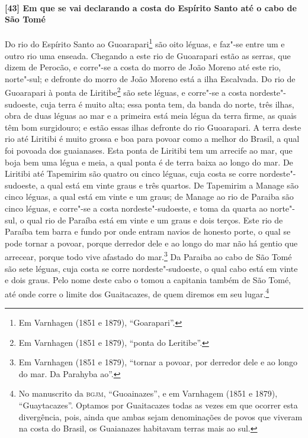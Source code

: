 \begin{linenumbers}
\paragraph{[43] Em que se vai declarando a costa do Espírito Santo até o cabo de São Tomé} \quad
Do rio do Espírito Santo ao Guoarapari\footnote{ Em Varnhagen (1851 e 1879),
``Goarapari''.} são oito léguas, e faz"-se entre um e outro rio uma enseada. Chegando a
este rio de Guoarapari estão as serras, que dizem de Perocão, e corre"-se a costa do morro
de João Moreno até este rio, norte"-sul; e defronte do morro de João Moreno está a ilha
Escalvada. Do rio de Guoarapari à ponta de Liritibe\footnote{ Em Varnhagen (1851 e 1879),
``ponta do Leritibe''.} são sete léguas, e corre"-se a costa nordeste"-sudoeste, cuja terra
é muito alta; essa ponta tem, da banda do norte, três ilhas, obra de duas léguas ao mar e
a primeira está meia légua da terra firme, as quais têm bom surgidouro; e estão essas
ilhas defronte do rio Guoarapari. A terra deste rio até Liritibi é muito grossa e boa para
povoar como a melhor do Brasil, a qual foi povoada dos guaianases. Esta ponta de Liritibi
tem um arrecife ao mar, que boja bem uma légua e meia, a qual ponta é de terra baixa ao
longo do mar. De Liritibi até Tapemirim são quatro ou cinco léguas, cuja costa se corre
nordeste"-sudoeste, a qual está em vinte graus e três quartos. De Tapemirim a Manage são
cinco léguas, a qual está em vinte e um graus; de Manage ao rio de Paraiba são cinco
léguas, e corre"-se a costa nordeste"-sudoeste, e toma da quarta ao norte"-sul, o qual rio de
Paraíba está em vinte e um graus e dois terços. Este rio de Paraíba tem barra e fundo por
onde entram navios de honesto porte, o qual se pode tornar a povoar, porque derredor dele
e ao longo do mar não há gentio que arrecear, porque todo vive afastado do mar.\footnote{
Em Varnhagen (1851 e 1879), ``tornar a povoar, por derredor dele e ao longo do mar. Da
Parahyba ao''.} Da Paraiba ao cabo de São Tomé são sete léguas, cuja costa se corre
nordeste"-sudoeste, o qual cabo está em vinte e dois graus. Pelo nome deste cabo o tomou a
capitania também de São Tomé, até onde corre o limite dos Guaitacazes, de quem diremos em
seu lugar.\footnote{ No manuscrito da \textsc{bgjm}, ``Guoainazes'', e em Varnhagem (1851
e 1879), ``Guaytacazes''. Optamos por Guaitacazes todas as vezes em que ocorrer esta
divergência, pois, ainda que ambas sejam denominações de povos que viveram na costa do
Brasil, os Guaianazes habitavam terras mais ao sul.}


\end{linenumbers}
